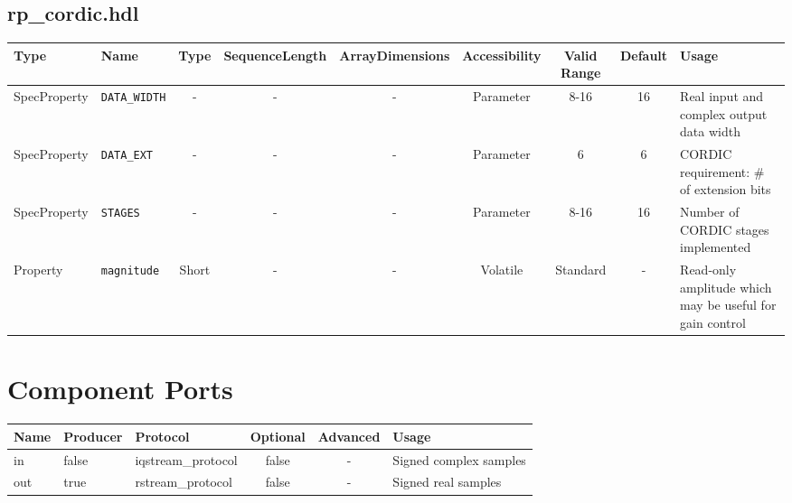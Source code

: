 \documentclass{article}
\def\comp{rp\_cordic}
\begin{document}
\begin{landscape}
	\subsection*{\comp.hdl}
	\begin{scriptsize}
		\begin{tabular}{|p{3cm}|p{2cm}|c|c|c|c|c|c|p{6cm}|}
			\hline
			\rowcolor{blue}
			Type         & Name              & Type  & SequenceLength & ArrayDimensions & Accessibility & Valid Range & Default & Usage                                                    \\
			\hline
			SpecProperty & \verb+DATA_WIDTH+ & -     & -              & -               & Parameter     & 8-16        & 16      & Real input and complex output data width                 \\
			\hline
			SpecProperty & \verb+DATA_EXT+   & -     & -              & -               & Parameter     & 6           & 6       & CORDIC requirement: \# of extension bits                 \\
			\hline
			SpecProperty & \verb+STAGES+     & -     & -              & -               & Parameter     & 8-16        & 16      & Number of CORDIC stages implemented                      \\
			\hline
			Property     & \verb+magnitude+  & Short & -              & -               & Volatile      & Standard    & -       & Read-only amplitude which may be useful for gain control \\
			\hline
		\end{tabular}
	\end{scriptsize}

	\section*{Component Ports}
	\begin{scriptsize}
		\begin{tabular}{|M{2cm}|M{1.5cm}|M{4cm}|c|c|M{9cm}|}
			\hline
			\rowcolor{blue}
			Name & Producer & Protocol           & Optional & Advanced & Usage                  \\
			\hline
			in   & false    & iqstream\_protocol & false    & -        & Signed complex samples \\
			\hline
			out  & true     & rstream\_protocol  & false    & -        & Signed real samples    \\
			\hline
		\end{tabular}
	\end{scriptsize}


\end{landscape}
\end{document}
